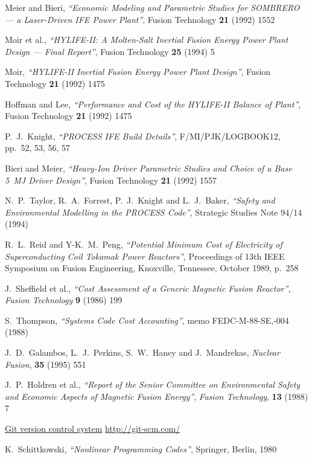 \documentclass[11pt,a4paper]{report}
\begin{document}
\begin{thebibliography}{99}
Meier and Bieri,
\textit{``Economic Modeling and Parametric Studies for SOMBRERO --- a Laser-Driven
  IFE Power Plant''},
Fusion Technology \textbf{21} (1992) 1552

Moir et al.,
\textit{``HYLIFE-II: A Molten-Salt Inertial Fusion Energy Power Plant Design
  --- Final Report''},
Fusion Technology \textbf{25} (1994) 5

Moir,
\textit{``HYLIFE-II Inertial Fusion Energy Power Plant Design''},
Fusion Technology \textbf{21} (1992) 1475

Hoffman and Lee,
\textit{``Performance and Cost of the HYLIFE-II Balance of Plant''},
Fusion Technology \textbf{21} (1992) 1475

P.\ J.\ Knight,
\textit{``PROCESS IFE Build Details''},
F/MI/PJK/LOGBOOK12, pp.\ 52, 53, 56, 57

Bieri and Meier,
\textit{``Heavy-Ion Driver Parametric Studies and Choice of a Base 5~MJ Driver
  Design''},
Fusion Technology \textbf{21} (1992) 1557

N.\ P.\ Taylor, R.\ A.\ Forrest, P.\ J.\ Knight and L.\ J.\ Baker,
\textit{``Safety and Environmental Modelling in the PROCESS Code''},
Strategic Studies Note 94/14 (1994)

R.\ L.\ Reid and Y-K.\ M.\ Peng,
\textit{``Potential Minimum Cost of Electricity of Superconducting Coil
Tokamak Power Reactors''},
Proceedings of 13th IEEE Symposium on Fusion Engineering, Knoxville,
Tennessee, October 1989, p.\ 258

J.\ Sheffield et al.,
\textit{``Cost Assessment of a Generic Magnetic Fusion Reactor''},
\textit{Fusion Technology} \textbf{9} (1986) 199

S.\ Thompson,
\textit{``Systems Code Cost Accounting''},
memo FEDC-M-88-SE,-004 (1988)

J.\ D.\ Galambos, L.\ J.\ Perkins, S.\ W.\ Haney and J.\ Mandrekas,
\textit{Nuclear Fusion}, \textbf{35} (1995) 551

J.\ P.\ Holdren et al.,
\textit{``Report of the Senior Committee on Environmental Safety and
Economic Aspects of Magnetic Fusion Energy''},
\textit{Fusion Technology}, \textbf{13} (1988) 7

\href{http://git-scm.com/}{Git version control system}
\url{http://git-scm.com/}

K.\ Schittkowski,
\textit{``Nonlinear Programming Codes''},
Springer, Berlin, 1980


\end{thebibliography}
\end{document}
